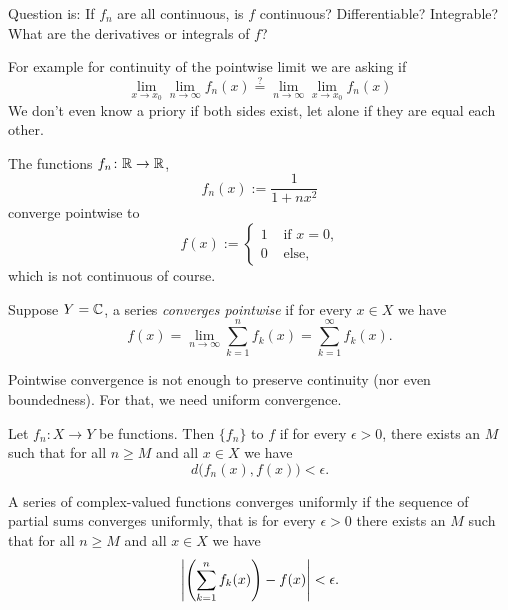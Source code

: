 Question is:
If $f_n$ are all continuous, is $f$ continuous?  Differentiable?
Integrable?  What are the derivatives or integrals of $f$?

For example for continuity of the pointwise limit we are asking if
\begin{equation*}
\lim_{x\to x_0} \lim_{n\to\infty} f_n(x)
\overset{?}{=}
\lim_{n\to\infty} \lim_{x\to x_0} f_n(x)
\end{equation*}
We don't even know a priory if both sides exist, let alone if they are equal each other.

\begin{example}
The functions $f_n \colon {\mathbb{R}} \to {\mathbb{R}}$,
\begin{equation*}
f_n(x) := \frac{1}{1+nx^2}
\end{equation*}
converge pointwise to
\begin{equation*}
f(x) := 
\begin{cases}
1 & \text{ if $x=0$,} \\
0 & \text{ else,}
\end{cases}
\end{equation*}
which is not continuous of course.
\end{example}

Suppose $Y={\mathbb{C}}$, a series
\emph{converges pointwise} if
for every $x \in X$ we have
\begin{equation*}
f(x) = \lim_{n\to \infty} \sum_{k=1}^n f_k(x) =
\sum_{k=1}^\infty f_k(x) .
\end{equation*}

Pointwise convergence is not enough to preserve continuity (nor even
boundedness).  For that, we need uniform convergence.

Let $f_n \colon X \to Y$ be functions.  Then
$\{f_n\}$ \emph{}
to $f$ if
for every $\epsilon > 0$, there exists an $M$ such that
for all $n \geq M$ and all $x \in X$ we have
\begin{equation*}
d\bigl(f_n(x),f(x)\bigr) < \epsilon .
\end{equation*}

A series of complex-valued functions converges uniformly if the sequence of
partial sums converges uniformly, that is for every $\epsilon > 0$
there exists an $M$ such that
for all $n \geq M$ and all $x \in X$ we have
\begin{equation*}
\left\lvert {\left(\sum_{k=1}^n f_k(x)\right)-f(x)} \right\rvert < \epsilon .
\end{equation*}

